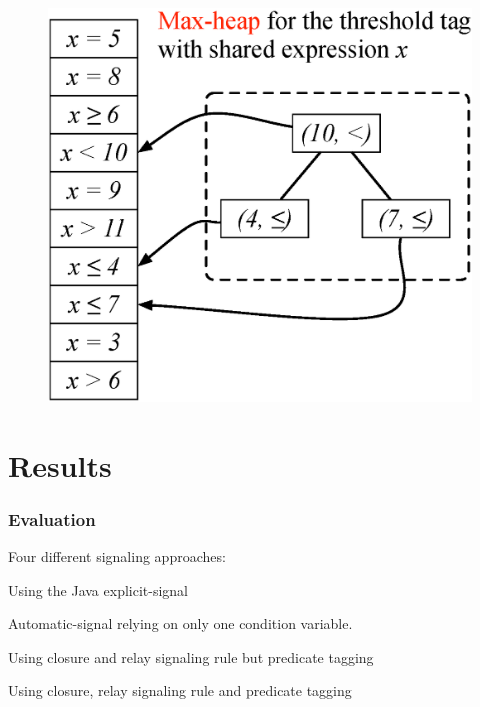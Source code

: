 \documentclass[mathserif,14pt,xcolor=table]{beamer}
\begin{document}
\begin{frame}
{\begin{figure}[ht!]
            \label{fig:fw}
        \end{figure}
    }
     {
        \begin{figure}[ht!]
            \centering
            \includegraphics[scale=0.50]{fig/tag_exp_8.eps}
            \label{fig:fw}
        \end{figure}
    }
\end{frame}

\section{Results}

\begin{frame}
    \frametitle{Evaluation}
    Four different signaling approaches: 
    \begin{description}[labelwidth=0]
        \item[Explicit] Using the Java explicit-signal 
        \item[Baseline] Automatic-signal relying on only one condition variable. 
        \item[AutoSynch-T] Using closure and relay signaling rule but predicate 
            tagging
        \item [AutoSynch] Using closure, relay signaling rule and predicate
            tagging
    \end{description}
\end{frame} 
\end{document}
